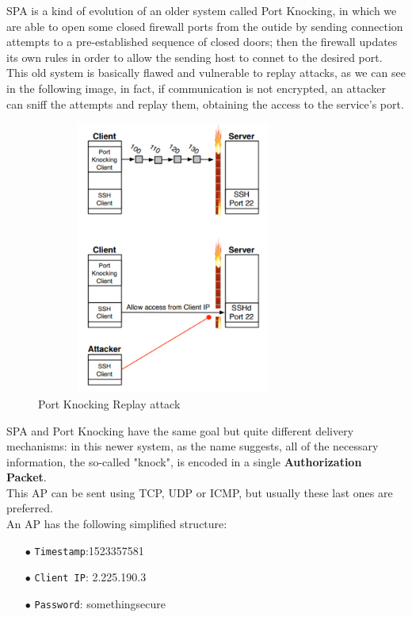 \documentclass[12pt]{report}
\begin{document}
{SPA is a kind of evolution of an older system called Port Knocking, in which we are able to  open some closed firewall ports from the outide by sending connection attempts to a pre-established sequence of closed doors; then the firewall updates its own rules in order to allow the sending host to connet to the desired port.\\
This old system is basically flawed and vulnerable to replay attacks, as we can see in the following image, in fact, if communication is not encrypted, an attacker can sniff the attempts and replay them, obtaining the access to the service's port.\\

\begin{figure}[H]
\includegraphics[width=9cm,height=9cm,keepaspectratio]{port_knocking}
\centering
\caption{Port Knocking Replay attack}
\end{figure}

SPA and Port Knocking have the same goal but quite different delivery mechanisms: in this newer system, as the name suggests, all of the necessary information, the so-called "knock", is encoded in a single \textbf{Authorization Packet}.\\
This AP can be sent using TCP, UDP or ICMP, but usually these last ones are preferred.\\
An AP has the following simplified structure:

\begin{itemize}
\setlength{\itemindent}{+4mm}
\item[$\bullet$] \texttt{Timestamp}:1523357581
\item[$\bullet$] \texttt{Client IP}: 2.225.190.3
\item[$\bullet$] \texttt{Password}: somethingsecure
\end{itemize}

}
\end{document}
